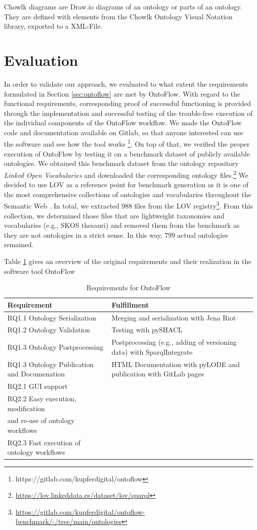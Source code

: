 \documentclass[sigconf]{acmart}
\begin{document}
Chowlk diagrams are Draw.io diagrams of an ontology or parts of an ontology.
They are defined with elements from the Chowlk Ontology Visual Notation library, exported to a XML-File.

\section{Evaluation}
In order to validate our approach, we evaluated to what extent the requirements formulated in Section \ref{sec:ontoflow} are met by OntoFlow. With regard to the functional requirements, corresponding proof of successful functioning is provided through the implementation and successful testing of the trouble-free execution of the individual components of the OntoFlow workflow. We made the OntoFlow code and documentation available on Gitlab, so that anyone interested can use the software and see how the tool works \footnote{https://gitlab.com/kupferdigital/ontoflow}. On top of that, we 
verified the proper execution of OntoFlow by testing it on a benchmark dataset of publicly available ontologies. We obtained this benchmark dataset from the ontology repository \textit{Linked Open Vocabularies} and downloaded the corresponding ontology files.\footnote{\url{https://lov.linkeddata.es/dataset/lov/sparql}} We decided to use LOV as a reference point for benchmark generation as it is one of the most comprehensive collections of ontologies and vocabularies throughout the Semantic Web \cite{lov}. In total, we extracted 988 files from the LOV registry\footnote{\url{https://gitlab.com/kupferdigital/ontoflow-benchmark/-/tree/main/ontologies}}. From this collection, we determined those files that are lightweight taxonomies and vocabularies (e.g., SKOS thesauri) and removed them from the benchmark as they are not ontologies in a strict sense. In this way, 799 actual ontologies remained. 


Table \ref{tab:eval} gives an overview of the original requirements and their realization in the software tool OntoFlow

\begin{table}[htb]
\begin{tabular}{@{}ll@{}}
\toprule
Requirement &
Fulfillment \\ \midrule
  RQ1.1 Ontology Serialization & Merging and serialization with Jena Riot\\
  RQ1.2 Ontology Validation & Testing with pySHACL\\
  RQ1.3 Ontology Postprocessing & Postprocessing (e.g., adding of versioning data) with SparqlIntegrate\\
  RQ1.3 Ontology Publication and Documenation & HTML Documentation with pyLODE and publication with GitLab pages\\
  RQ2.1 GUI support & \\
  RQ2.2 Easy execution, modification\\ and re-use of ontology workflows & \\
  RQ2.3 Fast execution of ontology workflows & 
\end{tabular}
\caption{Requirements for OntoFlow}
\label{tab:eval}
\end{table}
\end{document}
